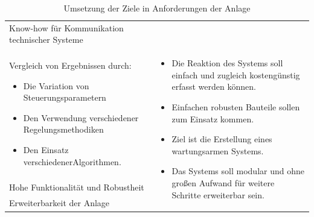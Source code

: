 \begin{table}[H]
\begin{tabularx}{1\textwidth}{m{}m{}}
\cmidrule[0.1pt](lr{2em}){1-1} 

Know-how für Kommunikation \newline technischer Systeme 	&		\\

\cmidrule[0.5pt](r{0.25em}){1-1} 
\cmidrule[0.5pt](l{0.25em}){2-2}

Vergleich von Ergebnissen durch:
\begin{minipage}[t]{0.34\textwidth}
\begin{itemize}[itemsep=0pt,topsep=1pt,leftmargin=4mm]
	\item Die Variation von \newline Steuerungsparametern
	\item Den Verwendung verschiedener \newline Regelungsmethodiken
	\item Den Einsatz verschiedener\newline Algorithmen.
\end{itemize}
\end{minipage}

& \multirow{3}{\hsize}{
\begin{minipage}[t]{0.57\textwidth}
\begin{itemize}[itemsep=0pt,topsep=0pt,leftmargin=5mm]
\item Die Reaktion des Systems soll einfach und zugleich kostengünstig erfasst werden können.
\item Einfachen robusten Bauteile sollen zum Einsatz kommen.
\item Ziel ist die Erstellung eines wartungsarmen Systems.
\item Das Systems soll modular und ohne großen Aufwand für weitere Schritte erweiterbar sein.
\end{itemize}
\end{minipage}
}  \\

\cmidrule[0.1pt](lr{2em}){1-1} 

Hohe Funktionalität und \newline Robustheit & \\

\cmidrule[0.1pt](lr{2em}){1-1} 

Erweiterbarkeit der Anlage
 &  \\

\bottomrule
\end{tabularx}
\caption{Umsetzung der Ziele in Anforderungen der Anlage}
\label{tab:anforderungen_umgebung}
\end{table}

